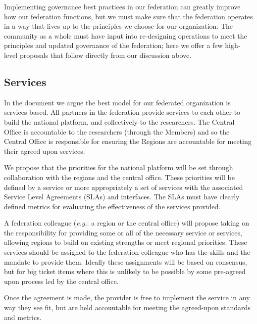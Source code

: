 \documentclass[11pt, letterpaper, twoside]{article}
\begin{document}
Implementing governance best practices in our federation can greatly
improve how our federation functions, but we must make sure that the
federation operates in a way that lives up to the principles we choose
for our organization. The community as a whole must have input into
re-designing operations to meet the principles and updated governance of
the federation; here we offer a few high-level proposals that follow
directly from our discussion above.

\subsection*{Services}
%

In the document we argue the best model for our federated organization
is services based. All partners in the federation provide services to
each other to build the national platform, and collectively to the
researchers. The Central Office is accountable to the researchers
(through the Members) and so the Central Office is responsible for
ensuring the Regions are accountable for meeting their agreed upon
services.

We propose that the priorities for the national platform will be set
through collaboration with the regions and the central office. These
priorities will be defined by a service or more appropriately a set of
services with the associated Service Level Agreements (SLAs) and
interfaces. The SLAs must have clearly defined metrics for evaluating
the effectiveness of the services provided.


A federation colleague (\textit{e.g.}: a region or the central office) will 
propose taking on the responsibility for providing some or all of the
necessary service or services, allowing regions to build on existing
strengths or meet regional priorities. These services should be assigned
to the federation colleague who has the skills and the mandate to
provide them. Ideally these assignments will be based on consensus, but
for big ticket items where this is unlikely to be possible by some
pre-agreed upon process led by the central office.

Once the agreement is made, the provider is free to implement the
service in any way they see fit, but are held accountable for meeting
the agreed-upon standards and metrics.

\end{document}
